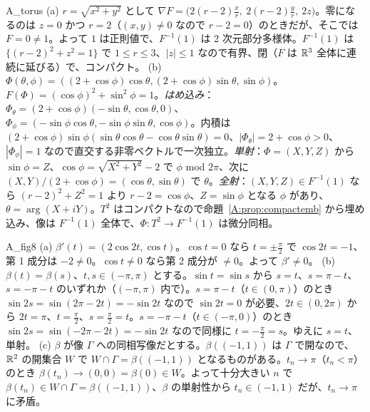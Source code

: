 \begin{soll}{A_torus}
(a) $r=\sqrt{x^2+y^2}$ として $\nabla F=\bigl(2(r-2)\frac xr,\ 2(r-2)\frac yr,\ 2z\bigr)$。零になるのは $z=0$ かつ $r=2$（$(x,y)\ne0$ なので $r-2=0$）のときだが、そこでは $F=0\ne1$。よって $1$ は正則値で、$F^{-1}(1)$ は 2 次元部分多様体。$F^{-1}(1)$ は $\{(r-2)^2+z^2=1\}$ で $1\le r\le3$、$|z|\le1$ なので有界、閉（$F$ は $\mathbb R^3$ 全体に連続に延びる）で、コンパクト。
(b) $\Phi(\theta,\phi)=((2+\cos\phi)\cos\theta,(2+\cos\phi)\sin\theta,\sin\phi)$。$F(\Phi)=(\cos\phi)^2+\sin^2\phi=1$。\emph{はめ込み}：$\Phi_\theta=(2+\cos\phi)(-\sin\theta,\cos\theta,0)$、$\Phi_\phi=(-\sin\phi\cos\theta,-\sin\phi\sin\theta,\cos\phi)$。内積は $(2+\cos\phi)\sin\phi(\sin\theta\cos\theta-\cos\theta\sin\theta)=0$、$|\Phi_\theta|=2+\cos\phi>0$、$|\Phi_\phi|=1$ なので直交する非零ベクトルで一次独立。\emph{単射}：$\Phi=(X,Y,Z)$ から $\sin\phi=Z$、$\cos\phi=\sqrt{X^2+Y^2}-2$ で $\phi$ mod $2\pi$、次に $(X,Y)/(2+\cos\phi)=(\cos\theta,\sin\theta)$ で $\theta$。\emph{全射}：$(X,Y,Z)\in F^{-1}(1)$ なら $(r-2)^2+Z^2=1$ より $r-2=\cos\phi$、$Z=\sin\phi$ となる $\phi$ があり、$\theta=\arg(X+iY)$。$T^2$ はコンパクトなので命題~\ref{A:prop:compactemb} から埋め込み、像は $F^{-1}(1)$ 全体で、$\Phi:T^2\to F^{-1}(1)$ は微分同相。
\end{soll}

\begin{soll}{A_fig8}
(a) $\beta'(t)=(2\cos2t,\cos t)$。$\cos t=0$ なら $t=\pm\frac\pi2$ で $\cos2t=-1$、第 1 成分は $-2\ne0$。$\cos t\ne0$ なら第 2 成分が $\ne0$。よって $\beta'\ne0$。
(b) $\beta(t)=\beta(s)$、$t,s\in(-\pi,\pi)$ とする。$\sin t=\sin s$ から $s=t$、$s=\pi-t$、$s=-\pi-t$ のいずれか（$(-\pi,\pi)$ 内で）。$s=\pi-t$（$t\in(0,\pi)$）のとき $\sin2s=\sin(2\pi-2t)=-\sin2t$ なので $\sin2t=0$ が必要、$2t\in(0,2\pi)$ から $2t=\pi$、$t=\frac\pi2$、$s=\frac\pi2=t$。$s=-\pi-t$（$t\in(-\pi,0)$）のとき $\sin2s=\sin(-2\pi-2t)=-\sin2t$ なので同様に $t=-\frac\pi2=s$。ゆえに $s=t$、単射。
(c) $\beta$ が像 $\Gamma$ への同相写像だとする。$\beta((-1,1))$ は $\Gamma$ で開なので、$\mathbb R^2$ の開集合 $W$ で $W\cap\Gamma=\beta((-1,1))$ となるものがある。$t_n\to\pi$（$t_n<\pi$）のとき $\beta(t_n)\to(0,0)=\beta(0)\in W$。よって十分大きい $n$ で $\beta(t_n)\in W\cap\Gamma=\beta((-1,1))$、$\beta$ の単射性から $t_n\in(-1,1)$ だが、$t_n\to\pi$ に矛盾。
\end{soll}

